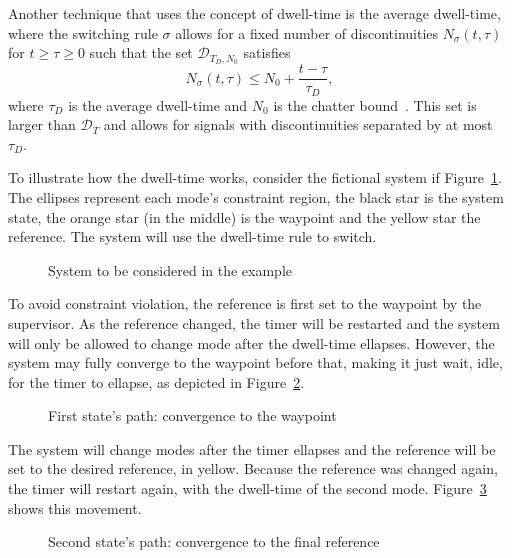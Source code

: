 Another technique that uses the concept of dwell-time is the average dwell-time,
where the switching rule \(\sigma\) allows for a fixed number of discontinuities
\(N_{\sigma}(t,\tau)\) for \(t\ge{}\tau{}\ge{}0\) such that the set
\(\mathcal{D}_{T_{D},N_{0}}\) satisfies
%
\begin{equation}
  N_{\sigma}(t,\tau) \le{} N_{0} + \frac{t-\tau}{\tau_{D}},
\end{equation}
%
where \(\tau_{D}\) is the average dwell-time and \(N_{0}\) is the chatter
bound~\parencite{hespanha.morse:stability}. This set is larger than
\(\mathcal{D}_{T}\) and allows for signals with discontinuities separated by at
most \(\tau_{D}\).

To illustrate how the dwell-time works, consider the fictional system if
Figure~\ref{fig:dt-ex1}. The ellipses represent each mode's constraint region,
the black star is the system state, the orange star (in the middle) is the
waypoint and the yellow star the reference. The system will use the dwell-time
rule to switch.

\begin{figure}[!htb]
  \centering
  
  \caption{System to be considered in the example}%
  \label{fig:dt-ex1}
\end{figure}

To avoid constraint violation, the reference is first set to the waypoint by the
supervisor. As the reference changed, the timer will be restarted and the system
will only be allowed to change mode after the dwell-time ellapses. However, the
system may fully converge to the waypoint before that, making it just wait,
idle, for the timer to ellapse, as depicted in Figure~\ref{fig:dt-ex2}.

\begin{figure}[!htb]
  \centering
  
  \caption{First state's path: convergence to the waypoint}%
  \label{fig:dt-ex2}
\end{figure}

The system will change modes after the timer ellapses and the reference will be
set to the desired reference, in yellow. Because the reference was changed
again, the timer will restart again, with the dwell-time of the second mode.
Figure~\ref{fig:dt-ex3} shows this movement.

\begin{figure}[!htb]
  \centering
  
  \caption{Second state's path: convergence to the final reference}%
  \label{fig:dt-ex3}
\end{figure}

